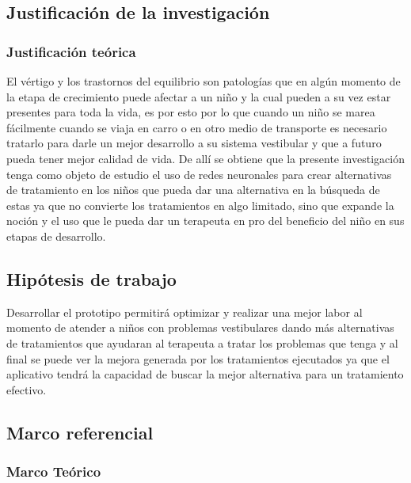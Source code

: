     \subsection{Justificación de la investigación}
    \subsubsection{Justificación teórica}
    El vértigo y los trastornos del equilibrio son patologías que en algún momento de la etapa de crecimiento puede afectar a un niño y la cual pueden a su vez estar presentes para toda la vida, es por esto por lo que cuando un niño se marea fácilmente cuando se viaja en carro o en otro medio de transporte es necesario tratarlo para darle un mejor desarrollo a su sistema vestibular y que a futuro pueda tener mejor calidad de vida.
    De allí se obtiene que la presente investigación tenga como objeto de estudio el uso de redes neuronales para crear alternativas de tratamiento en los niños que pueda dar una alternativa en la búsqueda de estas ya que no convierte los tratamientos en algo limitado, sino que expande la noción y el uso que le pueda dar un terapeuta en pro del beneficio del niño en sus etapas de desarrollo.
    \subsection{Hipótesis de trabajo}
    Desarrollar el prototipo permitirá optimizar y realizar una mejor labor al momento de atender a niños con problemas vestibulares dando más alternativas de tratamientos que ayudaran al terapeuta a tratar los problemas que tenga y al final se puede ver la mejora generada por los tratamientos ejecutados ya que el aplicativo tendrá la capacidad de buscar la mejor alternativa para un tratamiento efectivo.
    \subsection{Marco referencial}
    \subsubsection{Marco Teórico}
